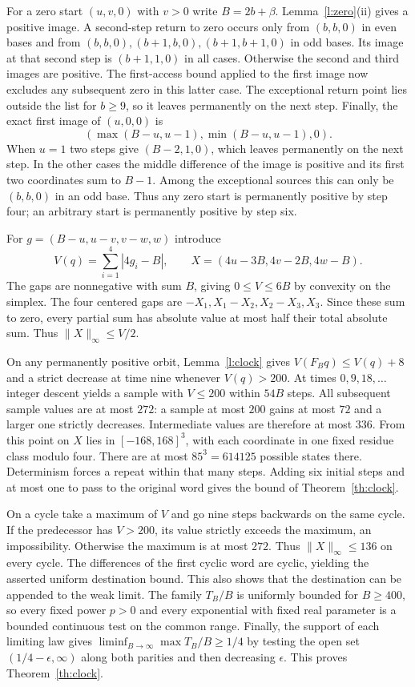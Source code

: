 \documentclass[11pt,reqno]{amsart}
\begin{document}
For a zero start $(u,v,0)$ with $v>0$ write $B=2b+\beta$.
Lemma~\ref{l:zero}(ii) gives a positive image. A second-step return
to zero occurs only from $(b,b,0)$ in even bases and from
$(b,b,0),(b+1,b,0),(b+1,b+1,0)$ in odd bases. Its image at that
second step is $(b+1,1,0)$ in all cases. Otherwise the second and third
images are positive. The first-access bound applied to the first image
now excludes any subsequent zero in this latter case. The exceptional
return point lies outside the list for $b\ge9$, so it leaves permanently
on the next step. Finally, the exact first image of $(u,0,0)$ is
\[
 (\max(B-u,u-1),\min(B-u,u-1),0).
\]
When $u=1$ two steps give $(B-2,1,0)$, which leaves permanently on the
next step. In the other cases the middle difference of the image is
positive and its first two coordinates sum to $B-1$. Among the exceptional
sources this can only be $(b,b,0)$ in an odd base. Thus any zero start
is permanently positive by step four; an arbitrary start is permanently
positive by step six.

For $g=(B-u,u-v,v-w,w)$ introduce
\[
 V(q)=\sum_{i=1}^4|4g_i-B|,\qquad X=(4u-3B,4v-2B,4w-B).
\]
The gaps are nonnegative with sum $B$, giving $0\le V\le6B$ by convexity
on the simplex. The four centered gaps are $-X_1,X_1-X_2,X_2-X_3,X_3$.
Since these sum to zero, every partial sum has absolute value at most
half their total absolute sum. Thus $\|X\|_\infty\le V/2$.

On any permanently positive orbit, Lemma~\ref{l:clock} gives
$V(F_Bq)\le V(q)+8$ and a strict decrease at time nine whenever $V(q)>200$.
At times $0,9,18,\ldots$ integer descent yields a sample with $V\le200$
within $54B$ steps. All subsequent sample values are at most $272$:
a sample at most $200$ gains at most $72$ and a larger one strictly
decreases. Intermediate values are therefore at most $336$. From this
point on $X$ lies in $[-168,168]^3$, with each coordinate in one fixed
residue class modulo four. There are at most $85^3=614125$ possible
states there. Determinism forces a repeat within that many steps.
Adding six initial steps and at most one to pass to the original word
gives the bound of Theorem~\ref{th:clock}.

On a cycle take a maximum of $V$ and go nine steps backwards on the
same cycle. If the predecessor has $V>200$, its value strictly exceeds
the maximum, an impossibility. Otherwise the maximum is at most $272$.
Thus $\|X\|_\infty\le136$ on every cycle. The differences of the first
cyclic word are cyclic, yielding the asserted uniform destination bound.
This also shows that the destination can be appended to the weak limit.
The family $T_B/B$ is uniformly bounded for $B\ge400$, so every fixed
power $p>0$ and every exponential with fixed real parameter is a bounded
continuous test on the common range. Finally, the support of each limiting
law gives $\liminf_{B\to\infty}\max T_B/B\ge1/4$ by testing the open set
$(1/4-\epsilon,\infty)$ along both parities and then decreasing $\epsilon$.
This proves Theorem~\ref{th:clock}.
\end{document}

